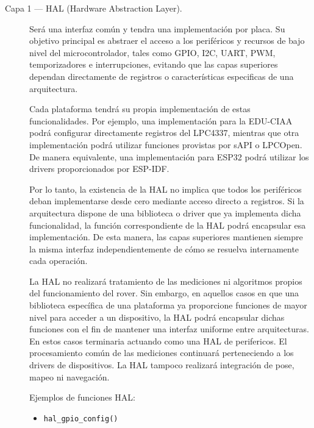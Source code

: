 \begin{description}

  \item[Capa 1 --- HAL (Hardware Abstraction Layer).]
       Será una interfaz común y tendra una implementación por placa. Su objetivo
        principal es abstraer el acceso a los periféricos y recursos de bajo
        nivel del microcontrolador, tales como GPIO, I2C, UART, PWM,
        temporizadores e interrupciones, evitando que las capas superiores
        dependan directamente de registros o características especificas de
        una arquitectura.

        Cada plataforma tendrá su propia implementación de estas funcionalidades.
        Por ejemplo, una implementación para la EDU-CIAA podrá configurar
        directamente registros del LPC4337, mientras que otra implementación
        podrá utilizar funciones provistas por sAPI o LPCOpen. De manera
        equivalente, una implementación para ESP32 podrá utilizar los drivers
        proporcionados por ESP-IDF.

        Por lo tanto, la existencia de la HAL no implica que todos los
        periféricos deban implementarse desde cero mediante acceso directo a
        registros. Si la arquitectura dispone de una biblioteca o driver que
        ya implementa dicha funcionalidad, la función correspondiente de la
        HAL podrá encapsular esa implementación. De esta manera, las capas
        superiores mantienen siempre la misma interfaz independientemente de
        cómo se resuelva internamente cada operación.

        La HAL no realizará tratamiento de las
        mediciones ni algoritmos propios del funcionamiento del rover.
        Sin embargo, en aquellos casos en que una biblioteca específica de
        una plataforma ya proporcione funciones de mayor nivel para acceder a
        un dispositivo, la HAL podrá encapsular dichas funciones con el fin de
        mantener una interfaz uniforme entre arquitecturas. En estos casos terminaria actuando como una HAL de perifericos.
        El procesamiento
        común de las mediciones continuará perteneciendo a los drivers de
        dispositivos. La HAL tampoco realizará integración de pose, mapeo ni
        navegación.

        \begin{visar}
Ejemplos de funciones HAL:
\begin{itemize}

  \item \texttt{hal\_gpio\_config()} 


\end{itemize}
\end{visar}
\end{description}
